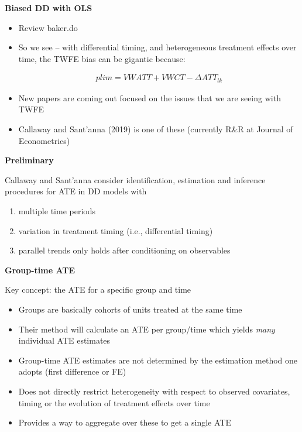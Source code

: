\documentclass[notes=show]{beamer}
\begin{document}
\begin{frame}[plain]
\begin{center}
\textbf{Biased DD with OLS}
\end{center}

\begin{itemize}
\item Review baker.do
\item So we see -- with differential timing, and heterogeneous treatment effects over time, the TWFE bias can be gigantic because:

\begin{eqnarray*}
plim = VWATT + VWCT - \Delta ATT_{lk}
\end{eqnarray*}

\item New papers are coming out focused on the issues that we are seeing with TWFE
\item Callaway and Sant'anna (2019) is one of these (currently R\&R at Journal of Econometrics)

\end{itemize}

\end{frame}


\begin{frame}[plain]
\begin{center}
\textbf{Preliminary}
\end{center}

Callaway and Sant'anna consider identification, estimation and inference procedures for ATE in DD models with

\begin{enumerate}
\item multiple time periods
\item variation in treatment timing (i.e., differential timing)
\item parallel trends only holds after conditioning on observables
\end{enumerate}

\end{frame}

\begin{frame}[plain]
\begin{center}
\textbf{Group-time ATE}
\end{center}

Key concept: the ATE for a specific group and time
\begin{itemize}
\item Groups are basically cohorts of units treated at the same time
\item Their method will calculate an ATE per group/time which yields \emph{many} individual ATE estimates
\item Group-time ATE estimates are not determined by the estimation method one adopts (first difference or FE)
\item Does not directly restrict heterogeneity with respect to observed covariates, timing or the evolution of treatment effects over time
\item Provides a way to aggregate over these to get a single ATE
\end{itemize}

\end{frame}
\end{document}
